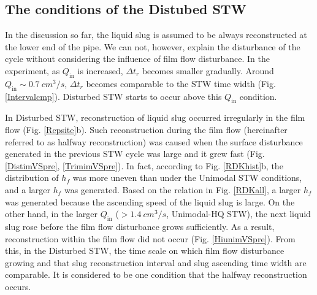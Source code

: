 \documentclass[aps,pre,preprint,groupedaddress,showkeys]{revtex4-2}
\begin{document}
\subsection{The conditions of the Distubed STW}
In the discussion so far, the liquid slug is assumed to be always reconstructed at the lower end of the pipe.
We can not, however, explain the disturbance of the cycle without considering the influence of film flow disturbance.
In the experiment, as $ Q_ \mathrm {in} $ is increased, $ \Delta t_r $ becomes smaller gradually. 
Around $ Q_ \mathrm{in} \sim \SI{0.7}{cm^ 3 / s}$, $ \Delta t_r $ becomes comparable to the STW time width (Fig. \ref{Intervalcmp}).
Disturbed STW starts to occur above this $ Q_ \mathrm {in} $ condition.

In Disturbed STW, reconstruction of liquid slug occurred irregularly in the film flow (Fig. \ref{Repsite}b).
Such reconstruction during the film flow (hereinafter referred to as halfway reconstruction) was caused when the surface disturbance generated in the previous STW cycle was large and it grew fast (Fig. \ref{DistimVSpre}, \ref{TrimimVSpre}).
In fact, according to Fig. \ref{RDKhist}b, the distribution of $ h_f $ was more uneven than under the Unimodal STW conditions, and a larger $ h_f $ was generated.
Based on the relation in Fig. \ref{RDKall}, a larger $ h_f $ was generated because the ascending speed of the liquid slug is large.
On the other hand, in the larger $ Q_ \mathrm {in} $ ($> \SI{1.4}{cm ^ 3/ s}$, Unimodal-HQ STW), the next liquid slug rose before the film flow disturbance grows sufficiently.
As a result, reconstruction within the film flow did not occur (Fig. \ref{HiunimVSpre}).
From this, in the Disturbed STW, the time scale on which film flow disturbance growing and that slug reconstruction interval and slug ascending time width are comparable.
It is considered to be one condition that the halfway reconstruction occurs.
\end{document}
